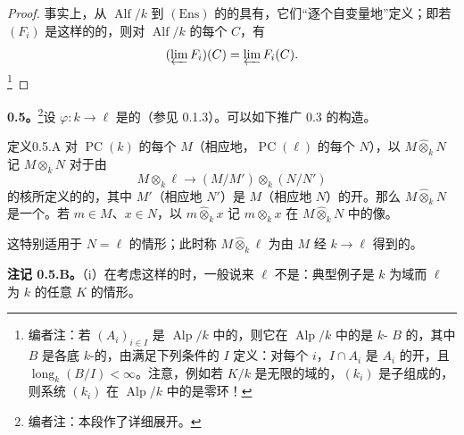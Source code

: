 \begin{proof}
事实上，从 $\operatorname{Alf}/k$ 到 $(\mathrm{Ens})$ 的的具有，它们“逐个自变量地”定义；即若 $(F_i)$ 是这样的的，则对 $\operatorname{Alf}/k$ 的每个 $C$，有
\[(\varprojlim F_i)(C)=\varprojlim F_i(C).\]
\footnote{编者注：若 $(A_i)_{i\in I}$ 是 $\operatorname{Alp}/k$ 中的，则它在 $\operatorname{Alp}/k$ 中的是 $k$- $B$ 的，其中 $B$ 是各底 $k$-的，由满足下列条件的 $I$ 定义：对每个 $i$，$I\cap A_i$ 是 $A_i$ 的开，且 $\operatorname{long}_k(B/I)<\infty$。注意，例如若 $K/k$ 是无限的域的，$(k_i)$ 是子组成的，则系统 $(k_i)$ 在 $\operatorname{Alp}/k$ 中的是零环！}
\end{proof}

\textbf{0.5。}\footnote{编者注：本段作了详细展开。}设 $\varphi:k\to\ell$ 是的（参见 0.1.3）。可以如下推广 0.3 的构造。
\begin{SGAresult}{定义}{0.5.A}
对 $\operatorname{PC}(k)$ 的每个 $M$（相应地，$\operatorname{PC}(\ell)$ 的每个 $N$），以 $M\widehat\otimes_k N$ 记 $M\otimes_k N$ 对于由
\[M\otimes_k\ell\longrightarrow(M/M')\otimes_k(N/N')\]
的核所定义的的，其中 $M'$（相应地 $N'$）是 $M$（相应地 $N$）的开。那么 $M\widehat\otimes_k N$ 是一个。若 $m\in M$、$x\in N$，以 $m\widehat\otimes_k x$ 记 $m\otimes_k x$ 在 $M\widehat\otimes_k N$ 中的像。

这特别适用于 $N=\ell$ 的情形；此时称 $M\widehat\otimes_k\ell$ 为由 $M$ 经 $k\to\ell$ 得到的。
\end{SGAresult}
\textbf{注记 0.5.B。}（i）在考虑这样的时，一般说来 $\ell$ 不是：典型例子是 $k$ 为域而 $\ell$ 为 $k$ 的任意 $K$ 的情形。

